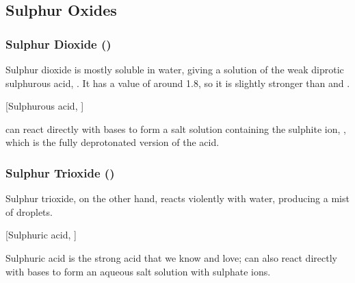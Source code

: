 

		\pagebreak
		\subsection{Sulphur Oxides}

			\subsubsection{Sulphur Dioxide (\texorpdfstring{}{SO₂})}

				Sulphur dioxide is mostly soluble in water, giving a solution of the weak diprotic sulphurous acid, . It has a
				\pKa{} value of around \num{1.8}, so it is slightly stronger than  and .

				[Sulphurous acid, ]


				 can react directly with bases to form a salt solution containing the sulphite ion, , which
				is the fully deprotonated version of the acid.





			\subsubsection{Sulphur Trioxide (\texorpdfstring{}{SO₃})}

				Sulphur trioxide, on the other hand, reacts violently with water, producing a mist of  droplets.

				[Sulphuric acid, ]

				Sulphuric acid is the strong acid that we know and love;  can also react directly with bases to
				form an aqueous salt solution with sulphate ions.

